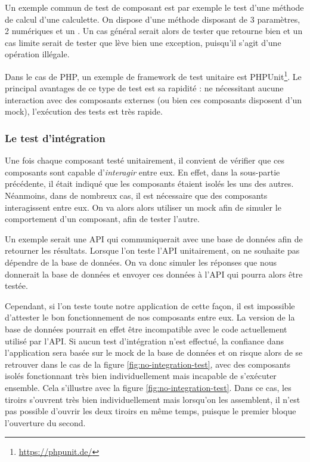 Un exemple commun de test de composant est par exemple le test d'une méthode de calcul d'une calculette. On dispose d'une méthode  disposant de 3 paramètres, 2  numériques et un . Un cas général serait alors de tester que  retourne bien  et un cas limite serait de tester que  lève bien une exception, puisqu'il s'agit d'une opération illégale.

Dans le cas de \gls{PHP}, un exemple de \gls{framework} de test unitaire est PHPUnit\footnote{\url{https://phpunit.de/}}. Le principal avantages de ce type de test est sa rapidité : ne nécessitant aucune interaction avec des composants externes (ou bien ces composants disposent d'un \gls{mock}), l'exécution des tests est très rapide.

\subsubsection{Le test d'intégration}

Une fois chaque composant testé unitairement, il convient de vérifier que ces composants sont capable d'\emph{interagir} entre eux. En effet, dans la sous-partie précédente, il était indiqué que les composants étaient isolés les uns des autres. Néanmoins, dans de nombreux cas, il est nécessaire que des composants interagissent entre eux. On va alors alors utiliser un \gls{mock} afin de simuler le comportement d'un composant, afin de tester l'autre.

Un exemple serait une \gls{API} qui communiquerait avec une base de données afin de retourner les résultats. Lorsque l'on teste l'\gls{API} unitairement, on ne souhaite pas dépendre de la base de données. On va donc simuler les réponses que nous donnerait la base de données et envoyer ces données à l'\gls{API} qui pourra alors être testée.

Cependant, si l'on teste toute notre application de cette façon, il est impossible d'attester le bon fonctionnement de nos composants entre eux. La version de la base de données pourrait en effet être incompatible avec le code actuellement utilisé par l'\gls{API}. Si aucun test d'intégration n'est effectué, la confiance dans l'application sera basée sur le \gls{mock} de la base de données et on risque alors de se retrouver dans le cas de la figure \ref{fig:no-integration-test}, avec des composants isolés fonctionnant très bien individuellement mais incapable de s'exécuter ensemble. Cela s'illustre avec la figure \ref{fig:no-integration-test}. Dans ce cas, les tiroirs s'ouvrent très bien individuellement mais lorsqu'on les assemblent, il n'est pas possible d'ouvrir les deux tiroirs en même temps, puisque le premier bloque l'ouverture du second.

